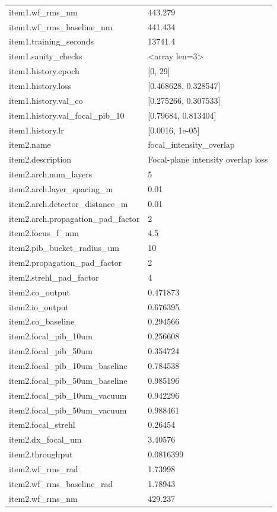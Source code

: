 \begin{longtable}{p{}p{}}
item1.wf\_rms\_nm & 443.279\\
item1.wf\_rms\_baseline\_nm & 441.434\\
item1.training\_seconds & 13741.4\\
item1.sanity\_checks & <array len=3>\\
item1.history.epoch & [0, 29]\\
item1.history.loss & [0.468628, 0.328547]\\
item1.history.val\_co & [0.275266, 0.307533]\\
item1.history.val\_focal\_pib\_10 & [0.79684, 0.813404]\\
item1.history.lr & [0.0016, 1e-05]\\
item2.name & focal\_intensity\_overlap\\
item2.description & Focal-plane intensity overlap loss\\
item2.arch.num\_layers & 5\\
item2.arch.layer\_spacing\_m & 0.01\\
item2.arch.detector\_distance\_m & 0.01\\
item2.arch.propagation\_pad\_factor & 2\\
item2.focus\_f\_mm & 4.5\\
item2.pib\_bucket\_radius\_um & 10\\
item2.propagation\_pad\_factor & 2\\
item2.strehl\_pad\_factor & 4\\
item2.co\_output & 0.471873\\
item2.io\_output & 0.676395\\
item2.co\_baseline & 0.294566\\
item2.focal\_pib\_10um & 0.256608\\
item2.focal\_pib\_50um & 0.354724\\
item2.focal\_pib\_10um\_baseline & 0.784538\\
item2.focal\_pib\_50um\_baseline & 0.985196\\
item2.focal\_pib\_10um\_vacuum & 0.942296\\
item2.focal\_pib\_50um\_vacuum & 0.988461\\
item2.focal\_strehl & 0.26454\\
item2.dx\_focal\_um & 3.40576\\
item2.throughput & 0.0816399\\
item2.wf\_rms\_rad & 1.73998\\
item2.wf\_rms\_baseline\_rad & 1.78943\\
item2.wf\_rms\_nm & 429.237\\

\end{longtable}
